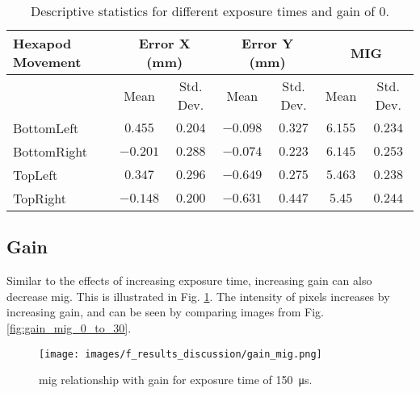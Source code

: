 \begin{table}[h]
    \vspace{10pt}

    \begin{subtable}{\textwidth}
        \centering
        \footnotesize
        \begin{tabular}{lcccccc}
            \toprule
            Hexapod Movement & \multicolumn{2}{c}{Error X (mm)} & \multicolumn{2}{c}{Error Y (mm)} & \multicolumn{2}{c}{MIG}  \\
            \midrule
            & \multicolumn{1}{c}{Mean} & \multicolumn{1}{c}{Std. Dev.} & \multicolumn{1}{c}{Mean} & \multicolumn{1}{c}{Std. Dev.} & \multicolumn{1}{c}{Mean} & \multicolumn{1}{c}{Std. Dev.} \\
            \midrule
            \textsf{BottomLeft} & $0.455$ & $0.204$ & $-0.098$ & $0.327$ & $6.155$ & $0.234$ \\
            \textsf{BottomRight} & $-0.201$ & $0.288$ & $-0.074$ & $0.223$ & $6.145$ & $0.253$ \\
            \textsf{TopLeft} & $0.347$ & $0.296$ & $-0.649$ & $0.275$ & $5.463$ & $0.238$ \\
            \textsf{TopRight} & $-0.148$ & $0.200$ & $-0.631$ & $0.447$ & $5.45$ & $0.244$ \\
            \bottomrule
        \end{tabular}
        \caption{\SI{3000}{\micro\second}}
    \end{subtable}

    \caption{Descriptive statistics for different exposure times and gain of $0$.}
    \label{table:stats_matrix_exposuretime}
\end{table}

\clearpage

\subsection*{Gain}
Similar to the effects of increasing exposure time, increasing gain can also decrease \gls{mig}. This is illustrated in Fig. \ref{fig:gain_mig.png}. The intensity of pixels increases by increasing gain, and can be seen by comparing images from Fig. \ref{fig:gain_mig_0_to_30}.

\begin{figure}[h]
    \centering
    \texttt{[image: images/f\_results\_discussion/gain\_mig.png]}
    \caption{\gls{mig} relationship with gain for exposure time of \SI{150}{\micro\second}.}
    \label{fig:gain_mig.png}
\end{figure}

